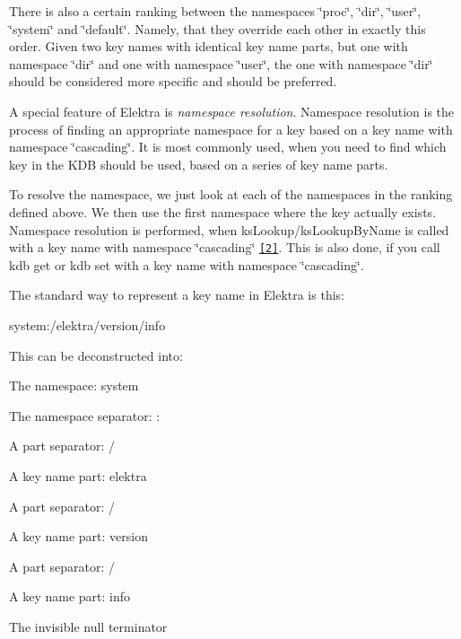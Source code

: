 There is also a certain ranking between the namespaces \char`\"{}proc\char`\"{}, \char`\"{}dir\char`\"{}, \char`\"{}user\char`\"{}, \char`\"{}system\char`\"{} and \char`\"{}default\char`\"{}. Namely, that they override each other in exactly this order. Given two key names with identical key name parts, but one with namespace \char`\"{}dir\char`\"{} and one with namespace \char`\"{}user\char`\"{}, the one with namespace \char`\"{}dir\char`\"{} should be considered more specific and should be preferred.

A special feature of Elektra is {\itshape namespace resolution}. Namespace resolution is the process of finding an appropriate namespace for a key based on a key name with namespace \char`\"{}cascading\char`\"{}. It is most commonly used, when you need to find which key in the K\+DB should be used, based on a series of key name parts.

To resolve the namespace, we just look at each of the namespaces in the ranking defined above. We then use the first namespace where the key actually exists. Namespace resolution is performed, when {\ttfamily ks\+Lookup}/{\ttfamily ks\+Lookup\+By\+Name} is called with a key name with namespace \char`\"{}cascading\char`\"{} \href{#footnote-2}{\tt \mbox{[}2\mbox{]}}.  This is also done, if you call {\ttfamily kdb get} or {\ttfamily kdb set} with a key name with namespace \char`\"{}cascading\char`\"{}.

The standard way to represent a key name in Elektra is this\+:


\begin{DoxyCode}
system:/elektra/version/info
\end{DoxyCode}


This can be deconstructed into\+:


\begin{DoxyItemize}
\item The namespace\+: {\ttfamily system}
\item The namespace separator\+: {\ttfamily \+:}
\item A part separator\+: {\ttfamily /}
\item A key name part\+: {\ttfamily elektra}
\item A part separator\+: {\ttfamily /}
\item A key name part\+: {\ttfamily version}
\item A part separator\+: {\ttfamily /}
\item A key name part\+: {\ttfamily info}
\item The invisible null terminator
\end{DoxyItemize}

